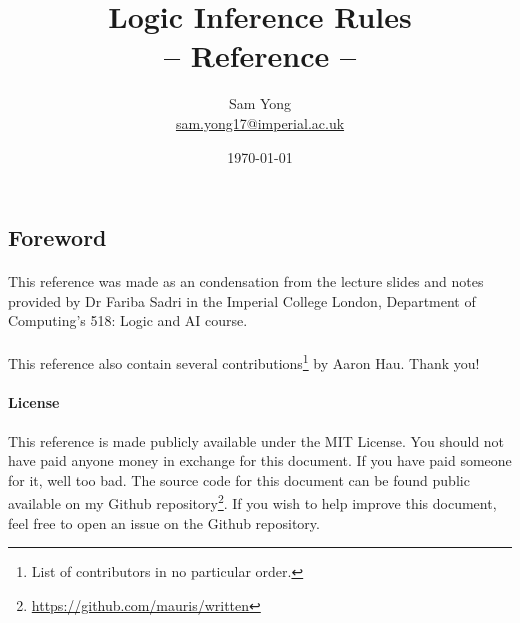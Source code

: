 \documentclass{article}
\title{
	 \huge Logic Inference Rules\\
	 \huge -- Reference --
}
\date{\today}
\author{
	Sam Yong \\
	\small \href{mailto:sam.yong17@imperial.ac.uk}{sam.yong17@imperial.ac.uk}
}
\theoremstyle{plain}
\theoremstyle{definition}
\begin{document}
\maketitle

\begin{multicols}{2}

\section*{Foreword}  

\paragraph{} This reference was made as an condensation from the lecture slides and notes provided by Dr Fariba Sadri in the Imperial College London, Department of Computing's 518: Logic and AI course.

\paragraph{} This reference also contain several contributions\footnote{List of contributors in no particular order.} by Aaron Hau. Thank you!

\begin{footnotesize}
\paragraph{License} This reference is made publicly available under the MIT License. You should not have paid anyone money in exchange for this document. If you have paid someone for it, well too bad. The source code for this document can be found public available on my Github repository\footnote{\href{https://github.com/mauris/written}{https://github.com/mauris/written}}. If you wish to help improve this document, feel free to open an issue on the Github repository.
\end{footnotesize}
\newpage

\end{multicols}
\end{document}
